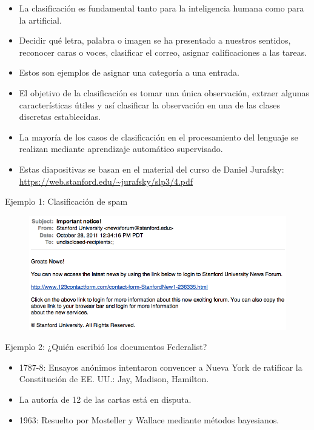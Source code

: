 \begin{itemize}
    \item La clasificación es fundamental tanto para la inteligencia humana como para la artificial.
    \item Decidir qué letra, palabra o imagen se ha presentado a nuestros sentidos, reconocer caras o voces, clasificar el correo, asignar calificaciones a las tareas.
    \item Estos son ejemplos de asignar una categoría a una entrada.
    \item El objetivo de la clasificación es tomar una única observación, extraer algunas características útiles y así clasificar la observación en una de las clases discretas establecidas.
    \item La mayoría de los casos de clasificación en el procesamiento del lenguaje se realizan mediante aprendizaje automático supervisado.
    \item Estas diapositivas se basan en el material del curso de Daniel Jurafsky: \url{https://web.stanford.edu/~jurafsky/slp3/4.pdf}
\end{itemize}

Ejemplo 1: Clasificación de spam

\begin{figure}[h]
\includegraphics[scale = 0.35]{pics/spam.png}
\end{figure}


Ejemplo 2: ¿Quién escribió los documentos Federalist?

\begin{itemize}
    \item 1787-8: Ensayos anónimos intentaron convencer a Nueva York de ratificar la Constitución de EE. UU.: Jay, Madison, Hamilton.
    \item La autoría de 12 de las cartas está en disputa.
    \item 1963: Resuelto por Mosteller y Wallace mediante métodos bayesianos.
\end{itemize}


